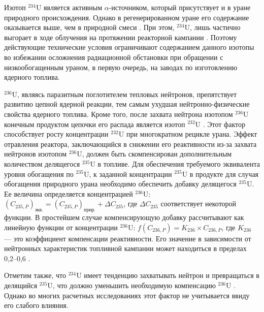 Изотоп $^{234}$U является активным $\alpha$-источником, который присутствует и в уране природного происхождения. Однако в регенерированном уране его содержание оказывается выше, чем в природной смеси \cite{matveevUran232EgoVliyanie1985,kryuchkovObogashchennyyUranDobavleniem2007}. При этом, $^{234}$U, лишь частично выгорает в ходе облучения на протяжении реакторной кампании \cite{gresleyEnrichingRecyclingUranium1988}. Поэтому действующие технические условия ограничивают содержанием данного изотопы во избежании осложнения радиационной обстановки при обращении с низкообогащенным ураном, в первую очередь, на заводах по изготовлению ядерного топлива.

$^{236}$U, являясь паразитным поглотителем тепловых нейтронов, препятствует развитию цепной ядерной реакции, тем самым ухудшая нейтронно-физические свойства ядерного топлива. Кроме того, после захвата нейтрона изотопом  $^{236}$U конечным продуктом цепочки его распада является изотоп  $^{232}$U \cite{ksenof88}. Этот фактор способствует росту концентрации $^{232}$U при многократном рецикле урана. 
Эффект отравления реактора, заключающийся в снижении его реактивности из-за захвата нейтронов изотопом  $^{236}$U, должен быть скомпенсирован дополнительным количеством делящегося $^{235}$U в топливе. Для обеспечения требуемого эквивалента уровня обогащения по $^{235}$U, к заданной концентрации $^{235}$U в продукте для случая обогащения природного урана необходимо обеспечить добавку делящегося $^{235}$U.
Ее величина определяется концентрацией $^{236}$U:
$(C_{235,P})_\textit{экв.}=(C_{235,P})_\textit{прир.}+\Delta C_{235}$, где $\Delta C_{235}$ соответствует некоторой функции. В простейшем случае компенсирующую добавку рассчитывают как линейную функции от концентрации $^{236}$U: $f(C_{236,P})=K_{236} \times C_{236,P}$, где $K_{236}$ --- это коэффициент компенсации реактивности. Его значение в зависимости от нейтронных характеристик топливной кампании может находиться в пределах 0,2--0,6 \cite{delagarzaMulticomponentIsotopeSeparation1961, borodynyaIssledovanieProblemyVovlecheniya1989,delculAnalysisReuseUranium2009}.


Отметим также, что $^{234}$U имеет тенденцию захватывать нейтрон и превращаться в делящийся $^{235}$U, что должно уменьшить необходимую компенсацию $^{236}$U \cite{dyachenkoIspolzovanieRegenerirovannogoUrana2012}. Однако во многих расчетных исследованиях этот фактор не учитывается ввиду его слабого влияния.


